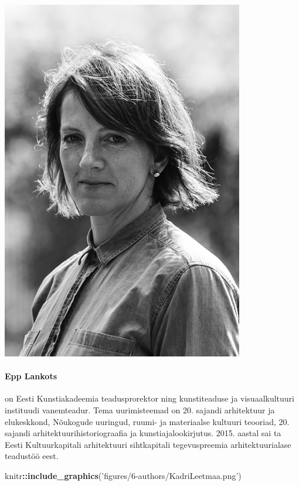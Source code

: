 \documentclass[estonian,]{article}
\newenvironment{Shaded}{\begin{snugshade}}{\end{snugshade}}
\newcommand{\KeywordTok}[1]{\textcolor[rgb]{0.13,0.29,0.53}{\textbf{#1}}}
\newcommand{\NormalTok}[1]{#1}
\newcommand{\OperatorTok}[1]{\textcolor[rgb]{0.81,0.36,0.00}{\textbf{#1}}}
\newcommand{\StringTok}[1]{\textcolor[rgb]{0.31,0.60,0.02}{#1}}
\let\oldparagraph\paragraph
\renewcommand{\paragraph}[1]{\oldparagraph{#1}\mbox{}}
\begin{document}
\begin{flushleft}\includegraphics[width=0.5\linewidth]{figures/6-authors/EppLankots} \end{flushleft}

\hypertarget{epp-lankots}{%
\paragraph{Epp Lankots}\label{epp-lankots}}

on Eesti Kunstiakadeemia teadusprorektor ning kunstiteaduse ja visuaalkultuuri instituudi vanemteadur. Tema uurimisteemad on 20. sajandi arhitektuur ja elukeskkond, Nõukogude uuringud, ruumi- ja materiaalse kultuuri teooriad, 20. sajandi arhitektuurihistoriograafia ja kunstiajalookirjutus. 2015. aastal sai ta Eesti Kultuurkapitali arhitektuuri sihtkapitali tegevuspreemia arhitektuurialase teadustöö eest.

\begin{Shaded}
\begin{Highlighting}[]
\NormalTok{knitr}\OperatorTok{::}\KeywordTok{include_graphics}\NormalTok{(}\StringTok{'figures/6-authors/KadriLeetmaa.png'}\NormalTok{)}
\end{Highlighting}
\end{Shaded}
\end{document}
